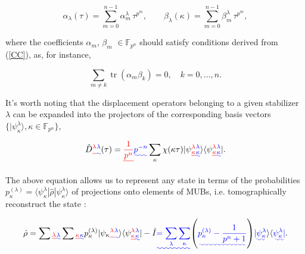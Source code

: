 \documentclass[quantumrep,article,submit,pdftex,moreauthors]{Definitions/mdpi}
\DeclareMathOperator{\tr}{tr}
\providecommand{\DIFadd}[1]{{\protect\color{blue}\uwave{#1}}} %
\providecommand{\DIFdel}[1]{{\protect\color{red}\sout{#1}}}                      %
\providecommand{\DIFaddbegin}{} %
\providecommand{\DIFaddend}{} %
\providecommand{\DIFdelbegin}{} %
\providecommand{\DIFdelend}{} %
\begin{document}
\begin{equation}
  \alpha_{\lambda }(\tau)
  = \sum_{m=0}^{n-1} \alpha_{m}^{\lambda } \,
  \tau^{p^{m}}, \qquad \beta_{\lambda}(\kappa)
  = \sum_{m=0}^{n-1}\beta_{m}^{\lambda} \, \tau^{p^{m}},
  \label{curve1}
\end{equation}

where the coefficients \DIFdelbegin \DIFdel{$\alpha _{m}$}\DIFdelend \DIFaddbegin \DIFadd{$\alpha_{m}$}\DIFaddend , $\beta _{m}$ $\in \mathbb{F}_{p^{n}}$
should satisfy conditions derived from (\ref{CC}), as, for instance,

\begin{equation*}
  \sum_{m \neq k} \tr(\alpha_{m}\beta _{k}) = 0, \quad k = 0,...,n.
\end{equation*}

It's worth noting that the displacement operators belonging to a given
stabilizer \DIFdelbegin \DIFdel{$\lambda$ }\DIFdelend \DIFaddbegin \DIFadd{$\lambda $ }\DIFaddend can be expanded into the projectors of the corresponding
basis vectors \DIFdelbegin \DIFdel{$\{|\psi_{\kappa }^{\lambda }\rangle, \kappa \in
\mathbb{F}_{p^{n}}\}$}\DIFdelend \DIFaddbegin \DIFadd{$\{|\psi _{\kappa }^{\lambda }\rangle ,\kappa \in
\mathbb{F}_{p^{n}}\}$}\DIFaddend ,

\begin{equation}
  \hat{D}\DIFdelbegin \DIFdel{^{\lambda}}\DIFdelend \DIFaddbegin \DIFadd{^{\lambda }}\DIFaddend (\tau )
  = \DIFdelbegin \DIFdel{\frac{1}{p^{n}} }\DIFdelend \DIFaddbegin \DIFadd{p^{-n} }\DIFaddend \sum_{\kappa }\chi (\kappa \tau )
  |\psi \DIFdelbegin \DIFdel{_{\kappa}^{\lambda}}\DIFdelend \DIFaddbegin \DIFadd{_{\kappa }^{\lambda }}\DIFaddend \rangle \langle \psi \DIFdelbegin \DIFdel{_{\kappa}^{\lambda}}\DIFdelend \DIFaddbegin \DIFadd{_{\kappa }^{\lambda }}\DIFaddend |.
  \label{Dexp}
\end{equation}

The above equation allows us to represent any state in terms of the
probabilities \DIFdelbegin \DIFdel{$p_{\kappa}^{(\lambda)} = \langle \psi_{\kappa }^{\lambda }|
\hat{\rho}|\psi_{\kappa}^{\lambda}\rangle$ }\DIFdelend \DIFaddbegin \DIFadd{$p_{\kappa }^{(\lambda )} = \langle \psi_{\kappa
}^{\lambda}|\hat{\rho}|\psi _{\kappa }^{\lambda }\rangle $ }\DIFaddend of projections onto
elements of MUBs, i.e. tomographically reconstruct the state
\cite{gibbons,galvao,cormick,ivanovic,DFW11,DFW12,Durt2006}:

\begin{equation}
  \hat{\rho}
  = \sum\DIFdelbegin \DIFdel{_{\lambda}}\DIFdelend \DIFaddbegin \DIFadd{_{\lambda }}\DIFaddend \sum\DIFdelbegin \DIFdel{_{\kappa}}\DIFdelend \DIFaddbegin \DIFadd{_{\kappa }
  }\DIFaddend p_{\kappa}^{(\lambda)} |\psi_{\kappa }\DIFdelbegin \DIFdel{^{\lambda}}\DIFdelend \DIFaddbegin \DIFadd{^{\lambda }}\DIFaddend \rangle
  \langle \psi \DIFdelbegin \DIFdel{_{\kappa}^{\lambda}}\DIFdelend \DIFaddbegin \DIFadd{_{\kappa }^{\lambda }}\DIFaddend | - \hat{I}
  \DIFaddbegin \DIFadd{= \sum_{\lambda }\sum_{\kappa }}\left( \DIFadd{p_{\kappa }^{(\lambda)} -
  \frac{1}{p^{n}+1}}\right) \DIFadd{|\psi _{\kappa }^{\lambda }}\rangle \langle
  \DIFadd{\psi_{\kappa }^{\lambda }|}\DIFaddend .
  \label{tom r}
\end{equation}
\end{document}
